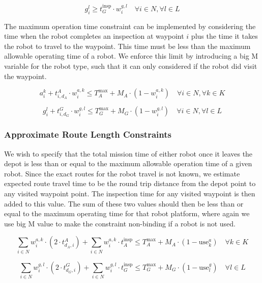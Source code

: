 \documentclass{article}
\begin{document}
				\begin{equation}
					g_i^l \geq t_G^{\text{insp}} \cdot w_i^{g,l} \quad \forall i \in N, \forall l \in L
				\end{equation}

				The maximum operation time constraint can be implemented by considering the time when the robot completes an inspection at waypoint $i$ plus the time it takes the robot to travel to the waypoint.
				This time must be less than the maximum allowable operating time of a robot. We enforce this limit by introducing a big M variable for the robot type, such that it can only considered if the robot did visit the waypoint.

				\begin{equation}
					a_i^k + t_{i,d_A}^{A} \cdot w_i^{a,k} \leq T_A^{\max} + M_A \cdot (1 - w_i^{a,k}) \quad \forall i \in N, \forall k \in K
				\end{equation}

				\begin{equation}
					g_i^l + t_{i,d_G}^{G} \cdot w_i^{g,l} \leq T_G^{\max} + M_G \cdot (1 - w_i^{g,l}) \quad \forall i \in N, \forall l \in L
				\end{equation}

			\subsubsection{Approximate Route Length Constraints}

				We wish to specify that the total mission time of either robot once it leaves the depot is less than or equal to the maximum allowable operation time of a given robot.
				Since the exact routes for the robot travel is not known, we estimate expected route travel time to be the round trip distance from the depot point to any visited waypoint point. 
				The inspection time for any visited waypoint is then added to this value.
				The sum of these two values should then be less than or equal to the maximum operating time for that robot platform, where again we use big M value to make the constraint non-binding if a robot is not used.
				

				\begin{equation}
					\sum_{i \in N} w_i^{a,k} \cdot \left( 2 \cdot t_{d_A,i}^{A}\right) + \sum_{i \in N} w_i^{a,k} \cdot t_A^{\text{insp}} \leq T_A^{\max} + M_A \cdot (1 - \text{use}_k^a) \quad \forall k \in K
				\end{equation}


				\begin{equation}
					\sum_{i \in N} w_i^{g,l} \cdot \left( 2 \cdot t_{d_G,i}^{G}\right) + \sum_{i \in N} w_i^{g,l} \cdot t_G^{\text{insp}} \leq T_G^{\max} + M_G \cdot (1 - \text{use}_l^g) \quad \forall l \in L
				\end{equation}
\end{document}
